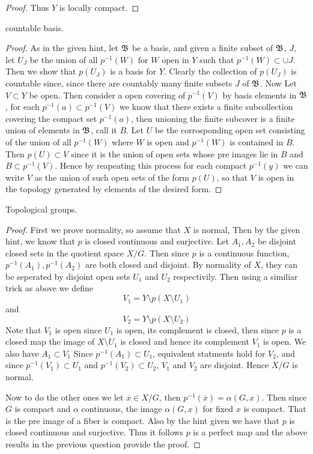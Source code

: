 \begin{alphaparts}
\begin{proof}
            Thus $Y$ is locally compact. 
        \end{proof}


        \questionpart 
        countable basis. 
        \begin{proof}
            As in the given hint, let $\mathfrak{B}$ be a basis, and given a finite subset of $\mathfrak{B}$, $J$, let $U_J$ be the union of all $p^{-1}(W)$ for $W$ open in $Y$ such that $p^{-1}(W) \subset \cup J$. 
            Then we show that $p(U_J)$ is a basis for $Y$. Clearly the collection of $p(U_J)$ is countable since, since there are countably many finite subsets $J$ of $\mathfrak{B}$. Now Let $V \subset Y$ be open.
             Then consider a open covering of $p^{-1}(V)$ by basis elements in $\mathfrak{B}$, for each $p^{-1}(a) \subset p^{-1}(V)$ we know that there 
            exists a finite subcollection covering the compact set $p^{-1}(a)$, then unioning the finite subcover is a finite union of elements in $\mathfrak{B}$, call it $B$. Let $U$ be the corrosponding open set consisting of the union of 
            all $p^{-1}(W)$ where $W$ is open and $p^{-1}(W)$ is contained in $B$. Then $p(U) \subset V$ since it is the union of open sets whose pre images lie in $B$ and $B \subset p^{-1}(V)$. Hence by reapeating this process for each compact $p^{-1}(y)$ 
            we can write $V$ as the union of such open sets of the form $p(U)$, so that $V$ is open in the topology generated by elements of the desired form. 
        \end{proof}
    \end{alphaparts}


    \question 
    Topological groups. 

    \begin{proof}
        First we prove normality, so assume that $X$ is normal, Then by the given hint, we know that $p$ is closed continuous and surjective. Let $A_1, A_2$ be disjoint closed sets in the quotient space $X / G$. 
        Then since $p$ is a continuous function, $p^{-1}(A_1), p^{-1}(A_2)$ are both closed and disjoint. By normality of $X$, they can be seperated by disjoint open sets $U_1$ and $U_2$ respectivily. Then 
        using a similiar trick as above we define 
        \[V_1 = Y \setminus p(X \setminus U_1)\]
        and 
        \[V_2 = Y \setminus p(X \setminus U_2)\]
        Note that $V_1$ is open since $U_1$ is open, its complement is closed, then since $p$ is a closed map the image of $X \setminus U_1$ is closed and hence its complement $V_1$ is open. 
        We also have $A_1 \subset V_1$ Since $p^{-1}(A_1) \subset U_1$, equivalent statments hold for $V_2$, and since $p^{-1}(V_1) \subset U_1$ and $p^{-1}(V_2) \subset U_2$, $V_1$ and $V_2$ are disjoint. Hence $X / G $ is normal. 

        Now to do the other ones we
        let $\overline{x} \in X/G$, then $p^{-1}(\overline{x}) = \alpha(G, x)$. Then since $G$ is compact and $\alpha$ continuous, the image $\alpha(G, x)$ for fixed $x$ is compact. That is the pre image of a fiber is compact. 
         Also by the hint given we have that $p$ is closed continuous and surjective. 
        Thus it follows $p$ is a perfect map and the above results in the previous question provide the proof. 
    \end{proof}
